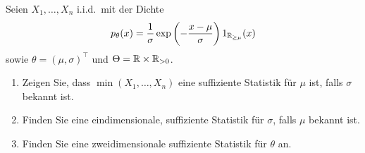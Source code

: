 Seien $X_1,\ldots,X_n$ i.i.d.\ mit der Dichte
\begin{equation*}
	p_\theta (x) = \frac{1}{\sigma} \exp \left(-\frac{x-\mu}{\sigma} \right) 1_{\mathbb R_{\geq\mu}}(x)
\end{equation*}
sowie $\theta = (\mu, \sigma)^\top$ und $\Theta = \mathbb R \times \mathbb R_{>0}$. 
\begin{enumerate}
    \item Zeigen Sie, dass $\min(X_1,\ldots,X_n)$ eine suffiziente Statistik
        für $\mu$ ist, falls $\sigma$ bekannt ist.
    \item Finden Sie eine eindimensionale, suffiziente Statistik für $\sigma$,
        falls $\mu$ bekannt ist.
    \item Finden Sie eine zweidimensionale suffiziente Statistik für $\theta$ an.
\end{enumerate}

